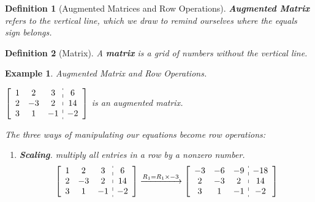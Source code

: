 \documentclass[12pt, a4paper]{article}
\newtheorem{df}{Definition}[subsection]
\newtheorem{eg}{Example}[subsection]
\begin{document}
\begin{df}[Augmented Matrices and Row Operations]
\textbf{Augmented Matrix} refers to the vertical line, which we draw to remind ourselves where the equals sign belongs.
\end{df}

\begin{df}[Matrix]
A \textbf{matrix} is a grid of numbers without the vertical line. 
\end{df}

\begin{eg}
Augmented Matrix and Row Operations. \par
\begin{center}
$\left[\begin{array}{c:c}\begin{matrix}1&2&3\\2&-3&2\\3&1&-1\end{matrix}&\begin{matrix}6\\14\\-2\end{matrix}\end{array}\right]$ is an augmented matrix. 
\end{center}
The three ways of manipulating our equations become row operations:
\begin{enumerate}
\item \textbf{Scaling}. multiply all entries in a row by a nonzero number. 
$$\left[\begin{array}{c:c}\begin{matrix}1&2&3\\2&-3&2\\3&1&-1\end{matrix}&\begin{matrix}6\\14\\-2\end{matrix}\end{array}\right]\xrightarrow[]{R_1=R_1\times-3} \left[\begin{array}{c:c}\begin{matrix}-3&-6&-9\\2&-3&2\\3&1&-1\end{matrix}&\begin{matrix}-18\\14\\-2\end{matrix}\end{array}\right]$$

\end{enumerate}
\end{eg}
\end{document}
